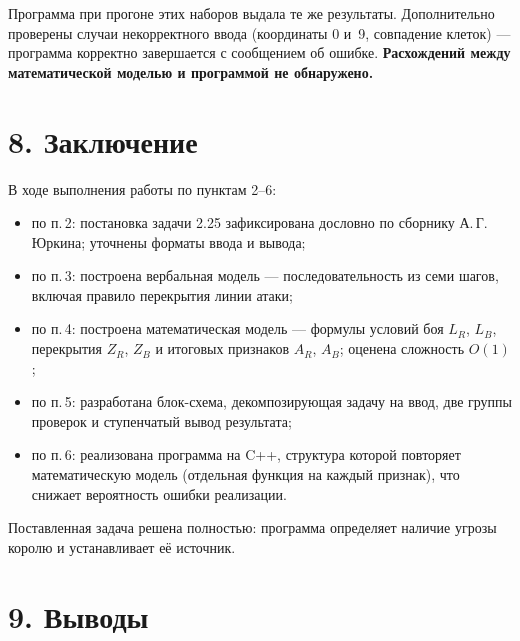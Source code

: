 \documentclass[12pt,a4paper]{article}
\begin{document}
Программа при прогоне этих наборов выдала те же результаты.
Дополнительно проверены случаи некорректного ввода (координаты 0 и~9,
совпадение клеток) --- программа корректно завершается с сообщением об
ошибке. \textbf{Расхождений между математической моделью и программой
не обнаружено.}

\section*{8. Заключение}

В ходе выполнения работы по пунктам 2--6:
\begin{itemize}
  \item по п.\,2: постановка задачи 2.25 зафиксирована дословно по
        сборнику А.\,Г.\,Юркина; уточнены форматы ввода и вывода;
  \item по п.\,3: построена вербальная модель --- последовательность
        из семи шагов, включая правило перекрытия линии атаки;
  \item по п.\,4: построена математическая модель --- формулы условий
        боя $L_R$, $L_B$, перекрытия $Z_R$, $Z_B$ и итоговых признаков
        $A_R$, $A_B$; оценена сложность $O(1)$;
  \item по п.\,5: разработана блок-схема, декомпозирующая задачу на
        ввод, две группы проверок и ступенчатый вывод результата;
  \item по п.\,6: реализована программа на C++, структура которой
        повторяет математическую модель (отдельная функция на каждый
        признак), что снижает вероятность ошибки реализации.
\end{itemize}
Поставленная задача решена полностью: программа определяет наличие
угрозы королю и устанавливает её источник.

\section*{9. Выводы}
\end{document}
